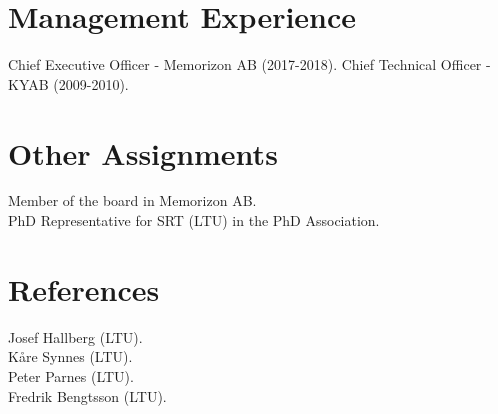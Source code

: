 \documentclass{article}
\begin{document}
\section{Management Experience}
Chief Executive Officer - Memorizon AB (2017-2018).
Chief Technical Officer - KYAB (2009-2010).

\section{Other Assignments}
Member of the board in Memorizon AB. \\
PhD Representative for SRT (LTU) in the PhD Association.

\section{References}
Josef Hallberg (LTU). \\
Kåre Synnes (LTU). \\
Peter Parnes (LTU). \\
Fredrik Bengtsson (LTU). \\
\end{document}
